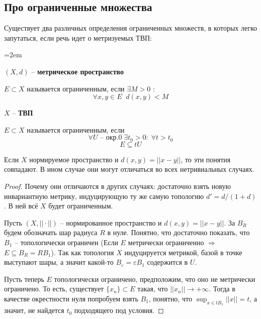\documentclass[12pt, a4paper, oneside]{book}
\begin{document}
\subsection{Про ограниченные множества}
Существует два различных определения ограниченных множеств, в которых легко запутаться, если речь идет о метризуемых ТВП:

\begin{minipage}[t]{50mm}\parindent=2em
\begin{center}
$(X,d)$ -- \textbf{метрическое пространство}
\end{center}
    $E \subset X$ называется ограниченным, если $\exists M > 0$ :\\
    $$\forall x, y \in E \; \; d(x,y) < M$$
\end{minipage}
\hfill
\begin{minipage}[t]{50mm}
\begin{center}
   $X$ -- \textbf{ТВП}
\end{center}
    $E \subset X$ называется ограниченным, если \\
    $$\forall U \text{ -- окр.} 0 \; \exists t_0 > 0 : \; \forall t > t_0 $$
$$ E \subseteq tU $$
\end{minipage}
\begin{lemma}
Если $X$ нормируемое пространство и $d(x, y) = ||x-y||$, то эти понятия совпадают. В ином случае они могут отличаться во всех нетривиальных случаях.
\end{lemma}
\begin{proof}
Почему они отличаются в других случаях: достаточно взять новую инвариантную метрику, индуцирующую ту же самую топологию $d' = d/(1+d)$. В ней всё $X$ будет ограниченным.

    Пусть $(X, || \cdot ||)$ -- нормированное пространство и $d(x,y) = ||x-y||$. За $B_R$ будем обозначать шар радиуса $R$ в нуле.
    Понятно, что достаточно показать, что $B_1$ -- топологически ограничен (Если $E$ метрически ограниченно $\Rightarrow$ $E \subseteq B_R = R B_1$).
    Так как топология $X$ индуцируется метрикой, базой в точке выступают шары, а значит какой-то $B_\varepsilon = \varepsilon B_1$ содержится в $U$.

    Пусть теперь $E$ топологически ограничено, предположим, что оно не метрически ограничено.
    То есть, существует $\{x_n\} \subset E$ такая, что $||x_n|| \to +\infty$. Тогда в качестве окрестности нуля попробуем взять $B_1$, понятно, что $\sup_{x \in tB_1} ||x|| = t$, а значит, не найдется $t_0$ подходящего под условия.
\end{proof}
\end{document}
